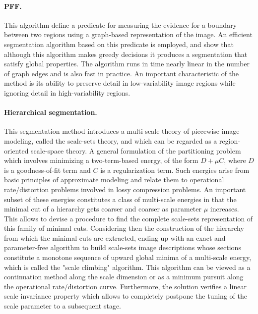 \paragraph{PFF. \\}
This algorithm define a predicate for measuring the evidence for a boundary between two regions using a graph-based representation of the image. An efficient segmentation algorithm based on this predicate is employed, and show that although this algorithm makes greedy decisions it produces a segmentation that satisfy global properties. The algorithm runs in time nearly linear in the number of graph edges and is also fast in practice. An important characteristic of the method is its ability to preserve detail in low-variability image regions while ignoring detail in high-variability regions.

\paragraph{Hierarchical segmentation. \\}
This segmentation method introduces a multi-scale theory of piecewise image modeling, called the scale-sets theory, and which can be regarded as a region-oriented scale-space theory. A general formulation of the partitioning problem which involves minimizing a two-term-based energy, of the form $D + \mu C$, where $D$ is a goodness-of-fit term and $C$ is a regularization term. Such energies arise from basic principles of approximate modeling and relate them to operational rate/distortion problems involved in lossy compression problems. An important subset of these energies constitutes a class of multi-scale energies in that the minimal cut of a hierarchy gets coarser and coarser as parameter $\mu$ increases. This allows to devise a procedure to find the complete scale-sets representation of this family of minimal cuts. Considering then the construction of the hierarchy from which the minimal cuts are extracted, ending up with an exact and parameter-free algorithm to build scale-sets image descriptions whose sections constitute a monotone sequence of upward global minima of a multi-scale energy, which is called the "scale climbing" algorithm. This algorithm can be viewed as a continuation method along the scale dimension or as a minimum pursuit along the operational rate/distortion curve. Furthermore, the solution verifies a linear scale invariance property which allows to completely postpone the tuning of the scale parameter to a subsequent stage.

